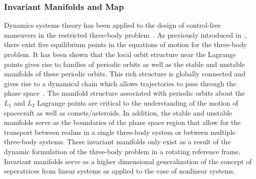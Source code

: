 \documentclass[smallcondensed]{svjour3}
\begin{document}
\subsubsection{Invariant Manifolds and \Poincare Map}\label{sec:invariant_manifold}
Dynamics systems theory has been applied to the design of control-free maneuvers in the restricted three-body problem~\cite{koon2011}.
As previously introduced in~, there exist five equilibrium points in the equations of motion for the three-body problem.
It has been shown that the local orbit structure near the Lagrange points gives rise to families of periodic orbits as well as the stable and unstable manifolds of these periodic orbits.
This rich structure is globally connected and gives rise to a dynamical chain which allows trajectories to pass through the phase space~\cite{koon2011,conley1968}.
The manifold structure associated with periodic orbits about the \( L_1 \) and \( L_2 \) Lagrange points are critical to the understanding of the motion of spacecraft as well as comets/asteroids.
In addition, the stable and unstable manifolds serve as the boundaries of the phase space region that allow for the transport between realms in a single three-body system or between multiple three-body systems.
These invariant manifolds only exist as a result of the dynamic formulation of the three-body problem in a rotating reference frame. 
Invariant manifolds serve as a higher dimensional generalization of the concept of seperatrices from linear systems as applied to the case of nonlinear systems. 
\end{document}
